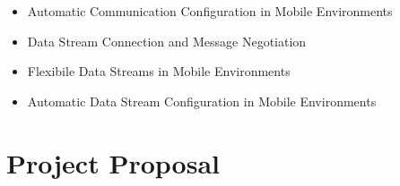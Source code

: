 \documentclass[12pt,twoside,notitlepage]{report}
\begin{document}
\begin{itemize}
\item Automatic Communication Configuration in Mobile Environments
\item Data Stream Connection and Message Negotiation
\item Flexibile Data Streams in Mobile Environments
\item Automatic Data Stream Configuration in Mobile Environments
\end{itemize}

\cleardoublepage

\chapter{Project Proposal}


\end{document}

